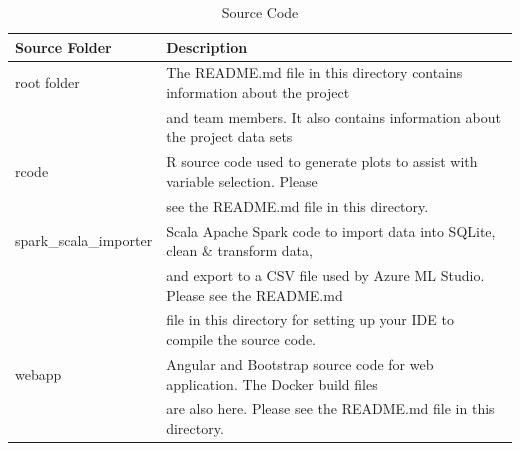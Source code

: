\documentclass[sigconf,nonacm,11pt]{acmart}
\begin{document}
\begin{table}[ht]
\caption{Source Code}
\centering
\begin{tabular}{p{0.3\linewidth}p{0.7\linewidth}}
\hline
Source Folder & Description \\
\hline
root folder & The README.md file in this directory contains information about the project\\
            & and team members. It also contains information about the project data sets\\
\hline
rcode & R source code used to generate plots to assist with variable selection. Please \\
      & see the README.md file in this directory.\\
\hline
spark\_scala\_importer & Scala Apache Spark code to import data into SQLite, clean \& transform data,\\
                       & and export to a CSV file used by Azure ML Studio. Please see the README.md\\
                       & file in this directory for setting up your IDE to compile the source code.\\
\hline
webapp                 & Angular and Bootstrap source code for web application. The Docker build files\\
                       & are also here.  Please see the README.md file in this directory.\\
\hline
\end{tabular}
\end{table}






\end{document}
